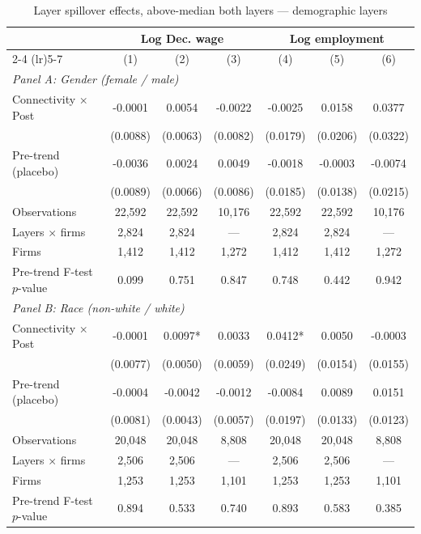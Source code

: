 \begin{table}[H]
\centering
\caption{Layer spillover effects, above-median both layers --- demographic layers}
\label{tab:layer_specs_abvmed_demog}
\scriptsize
\begin{threeparttable}
\begin{tabular}{lcccccc}
\toprule\toprule
 & \multicolumn{3}{c}{Log Dec. wage} & \multicolumn{3}{c}{Log employment} \\
\cmidrule(lr){2-4} \cmidrule(lr){5-7}
 & (1) & (2) & (3) & (4) & (5) & (6) \\
\midrule
\multicolumn{7}{l}{\textit{Panel A: Gender (female / male)}} \\
\quad Connectivity $\times$ Post & -0.0001 & 0.0054 & -0.0022 & -0.0025 & 0.0158 & 0.0377 \\
 & (0.0088) & (0.0063) & (0.0082) & (0.0179) & (0.0206) & (0.0322) \\
\quad Pre-trend (placebo) & -0.0036 & 0.0024 & 0.0049 & -0.0018 & -0.0003 & -0.0074 \\
 & (0.0089) & (0.0066) & (0.0086) & (0.0185) & (0.0138) & (0.0215) \\
\quad Observations & 22,592 & 22,592 & 10,176 & 22,592 & 22,592 & 10,176 \\
\quad Layers $\times$ firms & 2,824 & 2,824 & --- & 2,824 & 2,824 & --- \\
\quad Firms & 1,412 & 1,412 & 1,272 & 1,412 & 1,412 & 1,272 \\
\quad Pre-trend F-test $p$-value & 0.099 & 0.751 & 0.847 & 0.748 & 0.442 & 0.942 \\[6pt]
\multicolumn{7}{l}{\textit{Panel B: Race (non-white / white)}} \\
\quad Connectivity $\times$ Post & -0.0001 & 0.0097* & 0.0033 & 0.0412* & 0.0050 & -0.0003 \\
 & (0.0077) & (0.0050) & (0.0059) & (0.0249) & (0.0154) & (0.0155) \\
\quad Pre-trend (placebo) & -0.0004 & -0.0042 & -0.0012 & -0.0084 & 0.0089 & 0.0151 \\
 & (0.0081) & (0.0043) & (0.0057) & (0.0197) & (0.0133) & (0.0123) \\
\quad Observations & 20,048 & 20,048 & 8,808 & 20,048 & 20,048 & 8,808 \\
\quad Layers $\times$ firms & 2,506 & 2,506 & --- & 2,506 & 2,506 & --- \\
\quad Firms & 1,253 & 1,253 & 1,101 & 1,253 & 1,253 & 1,101 \\
\quad Pre-trend F-test $p$-value & 0.894 & 0.533 & 0.740 & 0.893 & 0.583 & 0.385 \\

\end{tabular}
\end{threeparttable}
\end{table}
